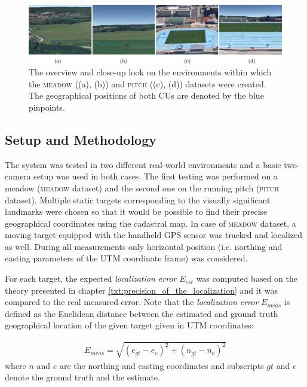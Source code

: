 \begin{figure}[htb]\centering
	\centering
	\includegraphics[width=0.98\linewidth]{fig/dataset_zebetin_vut.png}
	\caption{The overview and close-up look on the environments within which the \textsc{meadow} ((a), (b)) and \textsc{pitch} ((c), (d)) datasets were created. The geographical positions of both CUs are denoted by the blue pinpoints.}
	\label{fig:dataset_zebetin_vut}
\end{figure}

\subsection{Setup and Methodology} \label{txt:setup_and_methodology}

The system was tested in two different real-world environments and a basic two-camera setup was used in both cases. The first testing was performed on a meadow (\textsc{meadow} dataset) and the second one on the running pitch (\textsc{pitch} dataset). Multiple static targets corresponding to the visually significant landmarks were chosen so that it would be possible to find their precise geographical coordinates using the cadastral map. In case of \textsc{meadow} dataset, a moving target equipped with the handheld GPS sensor was tracked and localized as well. During all measurements only horizontal position (i.e. northing and easting parameters of the UTM coordinate frame) was considered.

For each target, the expected \textit{localization error} $E_{est}$ was computed based on the theory presented in chapter \ref{txt:precision_of_the_localization} and it was compared to the real measured error. Note that the \textit{localization error} $E_{meas}$ is defined as the Euclidean distance between the estimated and ground truth geographical location of the given target given in UTM coordinates:

\begin{align}
	E_{meas} = \sqrt{(e_{gt} - e_{e})^{2} + (n_{gt} - n_{e})^{2}}
\end{align}
where $n$ and $e$ are the northing and easting coordinates and subscripts $gt$ and $e$ denote the ground truth and the estimate.

